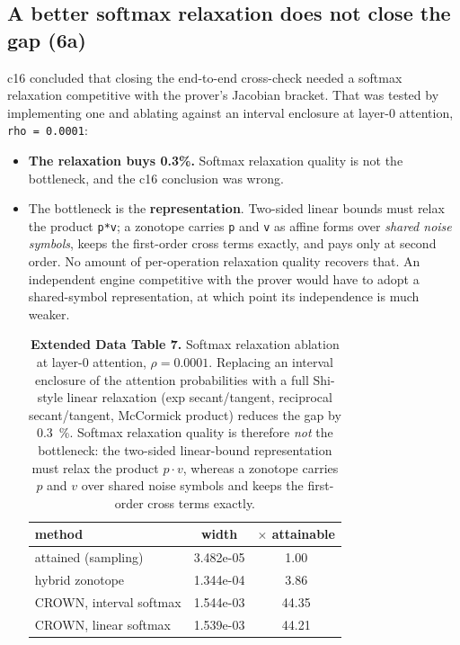 \documentclass[sn-nature,pdflatex]{sn-jnl}
\begin{document}
\subsection{A better softmax relaxation does not close the gap (6a)}
c16 concluded that closing the end-to-end cross-check needed a softmax relaxation competitive with the prover's Jacobian bracket. That was tested by implementing one and ablating against an interval enclosure at layer-0 attention, \texttt{rho = 0.0001}:
\begin{itemize}
\item \textbf{The relaxation buys 0.3\%.} Softmax relaxation quality is not the bottleneck, and the c16 conclusion was wrong.
\item The bottleneck is the \textbf{representation}. Two-sided linear bounds must relax the product \texttt{p*v}; a zonotope carries \texttt{p} and \texttt{v} as affine forms over \emph{shared noise symbols}, keeps the first-order cross terms exactly, and pays only at second order. No amount of per-operation relaxation quality recovers that. An independent engine competitive with the prover would have to adopt a shared-symbol representation, at which point its independence is much weaker.

\begin{table}[t]
\centering
\caption*{\textbf{Extended Data Table 7.} Softmax relaxation ablation at layer-0 attention, $\rho=\num{0.0001}$. Replacing an interval enclosure of the attention probabilities with a full Shi-style linear relaxation (exp secant/tangent, reciprocal secant/tangent, McCormick product) reduces the gap by \SI{0.3}{\percent}. Softmax relaxation quality is therefore \emph{not} the bottleneck: the two-sided linear-bound representation must relax the product $p\cdot v$, whereas a zonotope carries $p$ and $v$ over shared noise symbols and keeps the first-order cross terms exactly.}
\label{edtab:softmax}
\begin{tabular}{l S[table-format=1.3e2] S[table-format=2.2]}
\toprule
method & {width} & {$\times$ attainable} \\
\midrule
attained (sampling) & 3.482e-05 & 1.00 \\
hybrid zonotope & 1.344e-04 & 3.86 \\
CROWN, interval softmax & 1.544e-03 & 44.35 \\
CROWN, linear softmax & 1.539e-03 & 44.21 \\
\bottomrule
\end{tabular}
\end{table}

\end{itemize}
\end{document}
